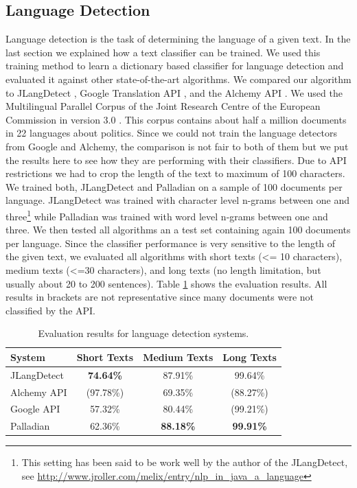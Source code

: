 \documentclass[a4paper,twoside]{book}      %
\begin{document}
\subsection{Language Detection}
Language detection is the task of determining the language of a given text. In the last section we explained how a text classifier can be trained. We used this training method to learn a dictionary based classifier for language detection and evaluated it against other state-of-the-art algorithms.
We compared our algorithm to JLangDetect \cite{jlangdetect}, Google Translation API \cite{googleTranslationAPI}, and the Alchemy API \cite{alchemyLanguageAPI}. We used the Multilingual Parallel Corpus of the Joint Research Centre of the European Commission in version 3.0 \cite{jrcCorpus}. This corpus contains about half a million documents in 22 languages about politics. Since we could not train the language detectors from Google and Alchemy, the comparison is not fair to both of them but we put the results here to see how they are performing with their classifiers. Due to API restrictions we had to crop the length of the text to maximum of 100 characters.
We trained both, JLangDetect and Palladian on a sample of 100 documents per language. JLangDetect was trained with character level n-grams between one and three\footnote{This setting has been said to be work well by the author of the JLangDetect, see \url{http://www.jroller.com/melix/entry/nlp_in_java_a_language}} while Palladian was trained with word level n-grams between one and three. We then tested all algorithms an a test set containing again 100 documents per language. Since the classifier performance is very sensitive to the length of the given text, we evaluated all algorithms with short texts (<= 10 characters), medium texts (<=30 characters), and long texts (no length limitation, but usually about 20 to 200 sentences).
Table \ref{tab:languageDetectionEvaluation} shows the evaluation results. All results in brackets are not representative since many documents were not classified by the API.

\begin{table}[ht]
\centering
\begin{tabular}{|l|c|c|c|}
	\hline
	System & Short Texts & Medium Texts & Long Texts \\ 
	\hline
	JLangDetect & \textbf{74.64\%} & 87.91\% & 99.64\% \\ 
	\hline
	Alchemy API & (97.78\%) & 69.35\% & (88.27\%) \\ 
	\hline
	Google API & 57.32\% & 80.44\% & (99.21\%) \\ 
	\hline
	Palladian & 62.36\% & \textbf{88.18\%} & \textbf{99.91\%}  \\ 
	\hline
\end{tabular}
\caption{Evaluation results for language detection systems.}
\label{tab:languageDetectionEvaluation}
\end{table}
\end{document}
